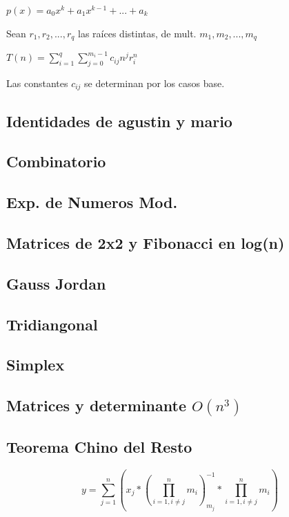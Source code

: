 $p(x)=a_0 x^k + a_1 x^{k-1} + ... + a_k$

Sean $r_1,r_2,...,r_q$ las raíces distintas, de mult. $m_1, m_2, ..., m_q$

$T(n)=\sum_{i=1}^q{\sum_{j=0}^{m_i - 1}c_{ij} n^j r_i^n}$

Las constantes $c_{ij}$ se determinan por los casos base.

\subsection{Identidades de agustin y mario}


\subsection{Combinatorio}

\subsection{Exp. de Numeros Mod.}

\subsection{Matrices de 2x2 y Fibonacci en log(n)}

\subsection{Gauss Jordan}
\subsection{Tridiangonal}
\subsection{Simplex}


\subsection{Matrices y determinante $O(n^3)$}

\subsection{Teorema Chino del Resto}
$$y=\sum_{j=1}^n (x_j*(\prod_{i=1, i\neq j}^n m_i)_{m_j}^{-1}*\prod_{i=1, i\neq j}^n m_i)$$
